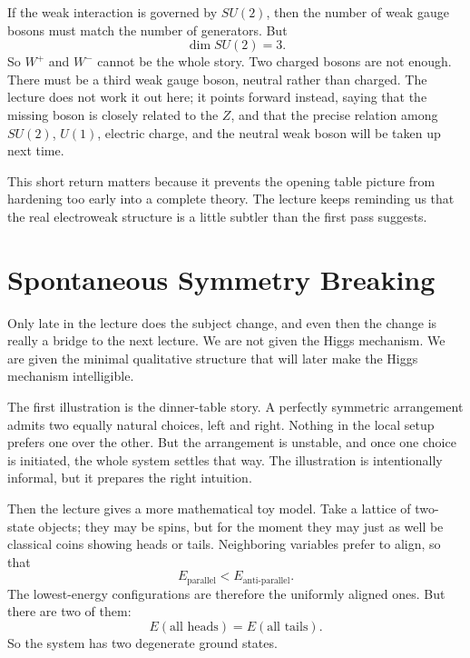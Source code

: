 If the weak interaction is governed by \(SU(2)\), then the number of weak gauge bosons must match the number of generators. But
\begin{equation}
\dim SU(2)=3.
\end{equation}
So \(W^+\) and \(W^-\) cannot be the whole story. Two charged bosons are not enough. There must be a third weak gauge boson, neutral rather than charged. The lecture does not work it out here; it points forward instead, saying that the missing boson is closely related to the \(Z\), and that the precise relation among \(SU(2)\), \(U(1)\), electric charge, and the neutral weak boson will be taken up next time.

This short return matters because it prevents the opening table picture from hardening too early into a complete theory. The lecture keeps reminding us that the real electroweak structure is a little subtler than the first pass suggests.

\section{Spontaneous Symmetry Breaking}

Only late in the lecture does the subject change, and even then the change is really a bridge to the next lecture. We are not given the Higgs mechanism. We are given the minimal qualitative structure that will later make the Higgs mechanism intelligible.

The first illustration is the dinner-table story. A perfectly symmetric arrangement admits two equally natural choices, left and right. Nothing in the local setup prefers one over the other. But the arrangement is unstable, and once one choice is initiated, the whole system settles that way. The illustration is intentionally informal, but it prepares the right intuition.

Then the lecture gives a more mathematical toy model. Take a lattice of two-state objects; they may be spins, but for the moment they may just as well be classical coins showing heads or tails. Neighboring variables prefer to align, so that
\begin{equation}
E_{\text{parallel}} < E_{\text{anti-parallel}}.
\end{equation}
The lowest-energy configurations are therefore the uniformly aligned ones. But there are two of them:
\begin{equation}
E(\text{all heads}) = E(\text{all tails}).
\end{equation}
So the system has two degenerate ground states.

